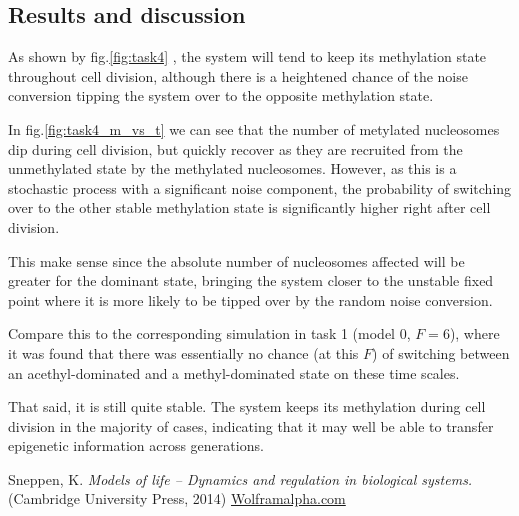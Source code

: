 \documentclass[fleqn,10pt]{SelfArx} %
\begin{document}
\subsection{Results and discussion}

As shown by fig.\eqref{fig:task4}
, the system will tend to keep its methylation state throughout cell division, although there is a heightened chance of the noise conversion tipping the system over to the opposite methylation state. 


In fig.\eqref{fig:task4_m_vs_t}
we can see that the number of metylated nucleosomes dip during cell division, but quickly recover as they are recruited from the unmethylated state by the methylated nucleosomes. However, as this is a stochastic process with a significant noise component, the probability of switching over to the other stable methylation state is significantly higher right after cell division. 

This make sense since the absolute number of nucleosomes affected will be greater for the dominant state, bringing the system closer to the unstable fixed point where it is more likely to be tipped over by the random noise conversion. 

Compare this to the corresponding simulation in task 1 (model 0, $F=6$), where it was found that there was essentially no chance (at this $F$) of switching between an acethyl-dominated and a methyl-dominated state on these time scales. 

That said, it is still quite stable. The system keeps its methylation during cell division in the majority of cases, indicating that it may well be able to transfer epigenetic information across generations.
 


\begin{thebibliography}{3}
Sneppen, K. \textit{Models of life -- Dynamics and regulation in biological systems.} (Cambridge University Press, 2014)
\href{Wolframalpha.com}{Wolframalpha.com}
\end{thebibliography}
\end{document}
